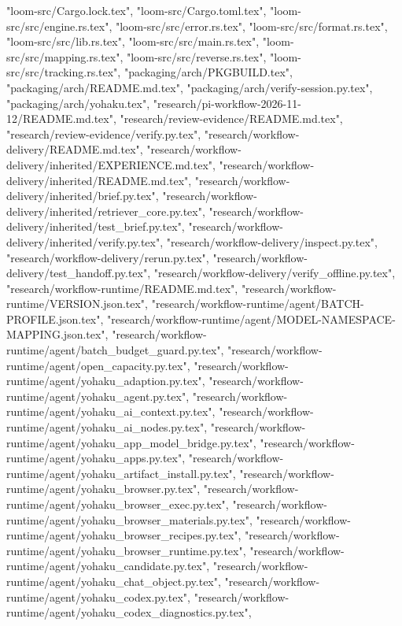 {    "loom-src/Cargo.lock.tex",
    "loom-src/Cargo.toml.tex",
    "loom-src/src/engine.rs.tex",
    "loom-src/src/error.rs.tex",
    "loom-src/src/format.rs.tex",
    "loom-src/src/lib.rs.tex",
    "loom-src/src/main.rs.tex",
    "loom-src/src/mapping.rs.tex",
    "loom-src/src/reverse.rs.tex",
    "loom-src/src/tracking.rs.tex",
    "packaging/arch/PKGBUILD.tex",
    "packaging/arch/README.md.tex",
    "packaging/arch/verify-session.py.tex",
    "packaging/arch/yohaku.tex",
    "research/pi-workflow-2026-11-12/README.md.tex",
    "research/review-evidence/README.md.tex",
    "research/review-evidence/verify.py.tex",
    "research/workflow-delivery/README.md.tex",
    "research/workflow-delivery/inherited/EXPERIENCE.md.tex",
    "research/workflow-delivery/inherited/README.md.tex",
    "research/workflow-delivery/inherited/brief.py.tex",
    "research/workflow-delivery/inherited/retriever_core.py.tex",
    "research/workflow-delivery/inherited/test_brief.py.tex",
    "research/workflow-delivery/inherited/verify.py.tex",
    "research/workflow-delivery/inspect.py.tex",
    "research/workflow-delivery/rerun.py.tex",
    "research/workflow-delivery/test_handoff.py.tex",
    "research/workflow-delivery/verify_offline.py.tex",
    "research/workflow-runtime/README.md.tex",
    "research/workflow-runtime/VERSION.json.tex",
    "research/workflow-runtime/agent/BATCH-PROFILE.json.tex",
    "research/workflow-runtime/agent/MODEL-NAMESPACE-MAPPING.json.tex",
    "research/workflow-runtime/agent/batch_budget_guard.py.tex",
    "research/workflow-runtime/agent/open_capacity.py.tex",
    "research/workflow-runtime/agent/yohaku_adaption.py.tex",
    "research/workflow-runtime/agent/yohaku_agent.py.tex",
    "research/workflow-runtime/agent/yohaku_ai_context.py.tex",
    "research/workflow-runtime/agent/yohaku_ai_nodes.py.tex",
    "research/workflow-runtime/agent/yohaku_app_model_bridge.py.tex",
    "research/workflow-runtime/agent/yohaku_apps.py.tex",
    "research/workflow-runtime/agent/yohaku_artifact_install.py.tex",
    "research/workflow-runtime/agent/yohaku_browser.py.tex",
    "research/workflow-runtime/agent/yohaku_browser_exec.py.tex",
    "research/workflow-runtime/agent/yohaku_browser_materials.py.tex",
    "research/workflow-runtime/agent/yohaku_browser_recipes.py.tex",
    "research/workflow-runtime/agent/yohaku_browser_runtime.py.tex",
    "research/workflow-runtime/agent/yohaku_candidate.py.tex",
    "research/workflow-runtime/agent/yohaku_chat_object.py.tex",
    "research/workflow-runtime/agent/yohaku_codex.py.tex",
    "research/workflow-runtime/agent/yohaku_codex_diagnostics.py.tex",
}
